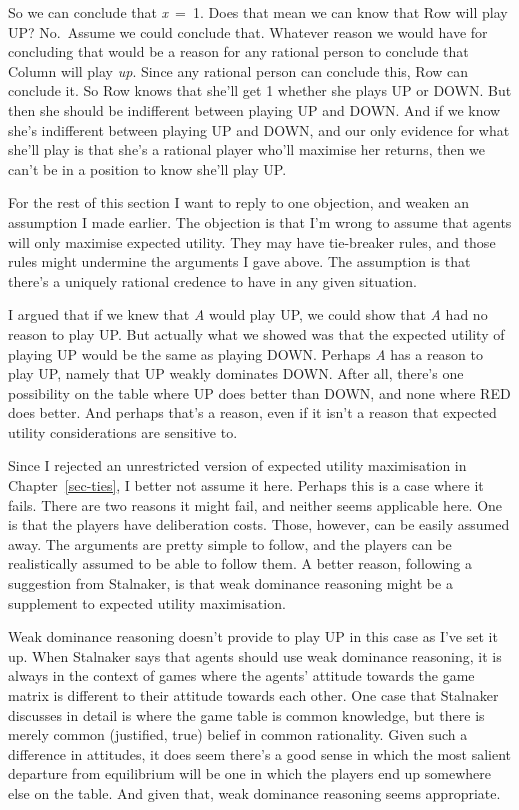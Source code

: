 \documentclass[
  12pt,
  letterpaper,
]{scrbook}
\begin{document}
So we can conclude that \emph{x}~=~1. Does that mean we can know that
Row will play UP? No.~Assume we could conclude that. Whatever reason we
would have for concluding that would be a reason for any rational person
to conclude that Column will play \emph{up}. Since any rational person
can conclude this, Row can conclude it. So Row knows that she'll get 1
whether she plays UP or DOWN. But then she should be indifferent between
playing UP and DOWN. And if we know she's indifferent between playing UP
and DOWN, and our only evidence for what she'll play is that she's a
rational player who'll maximise her returns, then we can't be in a
position to know she'll play UP.

For the rest of this section I want to reply to one objection, and
weaken an assumption I made earlier. The objection is that I'm wrong to
assume that agents will only maximise expected utility. They may have
tie-breaker rules, and those rules might undermine the arguments I gave
above. The assumption is that there's a uniquely rational credence to
have in any given situation.

I argued that if we knew that \emph{A} would play UP, we could show that
\emph{A} had no reason to play UP. But actually what we showed was that
the expected utility of playing UP would be the same as playing DOWN.
Perhaps \emph{A} has a reason to play UP, namely that UP weakly
dominates DOWN. After all, there's one possibility on the table where UP
does better than DOWN, and none where RED does better. And perhaps
that's a reason, even if it isn't a reason that expected utility
considerations are sensitive to.

Since I rejected an unrestricted version of expected utility
maximisation in Chapter~\ref{sec-ties}, I better not assume it here.
Perhaps this is a case where it fails. There are two reasons it might
fail, and neither seems applicable here. One is that the players have
deliberation costs. Those, however, can be easily assumed away. The
arguments are pretty simple to follow, and the players can be
realistically assumed to be able to follow them. A better reason,
following a suggestion from Stalnaker, is that weak dominance reasoning
might be a supplement to expected utility maximisation.

Weak dominance reasoning doesn't provide to play UP in this case as I've
set it up. When Stalnaker says that agents should use weak dominance
reasoning, it is always in the context of games where the agents'
attitude towards the game matrix is different to their attitude towards
each other. One case that Stalnaker discusses in detail is where the
game table is common knowledge, but there is merely common (justified,
true) belief in common rationality. Given such a difference in
attitudes, it does seem there's a good sense in which the most salient
departure from equilibrium will be one in which the players end up
somewhere else on the table. And given that, weak dominance reasoning
seems appropriate.
\end{document}
